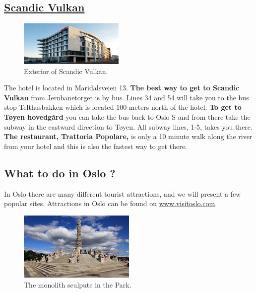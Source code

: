 \documentclass{article}
\begin{document}
\subsection*{\underline{Scandic Vulkan}}
\begin{figure}
\centering
\includegraphics[width=0.45\textwidth, height=0.3\textwidth]{img/scandic-vulkan.jpg}
\caption{\label{fig:frog1}Exterior of Scandic Vulkan.}
\end{figure}
The hotel is located in Maridalsveien 13.
\textbf{The best way to get to Scandic Vulkan} from
Jernbanetorget is by bus. Lines 34 and 54 will take you
to the bus stop Telthusbakken which is located 100 meters
north of the hotel. \textbf{To get to Tøyen hovedgård}
you can take the bus back to Oslo S and from there take
the subway in the eastward direction to Tøyen. All subway
lines, 1-5, takes you there. \textbf{The restaurant, Trattoria Popolare,}
is only a 10 minute walk along the river
 from your hotel and this is also
the fastest way to get there.



\clearpage
\begin{center}


\section*{What to do in Oslo ?}
In Oslo there are many different tourist attractions, and we will present a few  popular sites. Attractions in Oslo can be found on \href{www.visitoslo.com}{www.visitoslo.com}.


\end{center}
\begin{figure}
    \centering
    \captionsetup{width=0.4\textwidth}
    \includegraphics[width=0.5\textwidth]{img/Vigelansparken.jpg}%
     \caption*{The monolith sculpute in the Park.}
\end{figure}
\end{document}
